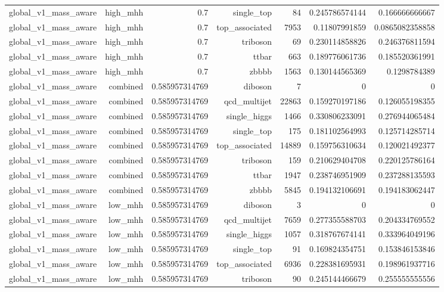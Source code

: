 \begin{table}[htbp]
{\begin{tabular}{lrrrrrr}
global\_v1\_mass\_aware & high\_mhh & 0.7 & single\_top & 84 & 0.245786574144 & 0.166666666667 \\
global\_v1\_mass\_aware & high\_mhh & 0.7 & top\_associated & 7953 & 0.11807991859 & 0.0865082358858 \\
global\_v1\_mass\_aware & high\_mhh & 0.7 & triboson & 69 & 0.230114858826 & 0.246376811594 \\
global\_v1\_mass\_aware & high\_mhh & 0.7 & ttbar & 663 & 0.189776061736 & 0.185520361991 \\
global\_v1\_mass\_aware & high\_mhh & 0.7 & zbbbb & 1563 & 0.130144565369 & 0.1298784389 \\
global\_v1\_mass\_aware & combined & 0.585957314769 & diboson & 7 & 0 & 0 \\
global\_v1\_mass\_aware & combined & 0.585957314769 & qcd\_multijet & 22863 & 0.159270197186 & 0.126055198355 \\
global\_v1\_mass\_aware & combined & 0.585957314769 & single\_higgs & 1466 & 0.330806233091 & 0.276944065484 \\
global\_v1\_mass\_aware & combined & 0.585957314769 & single\_top & 175 & 0.181102564993 & 0.125714285714 \\
global\_v1\_mass\_aware & combined & 0.585957314769 & top\_associated & 14889 & 0.159756310634 & 0.120021492377 \\
global\_v1\_mass\_aware & combined & 0.585957314769 & triboson & 159 & 0.210629404708 & 0.220125786164 \\
global\_v1\_mass\_aware & combined & 0.585957314769 & ttbar & 1947 & 0.238746951909 & 0.237288135593 \\
global\_v1\_mass\_aware & combined & 0.585957314769 & zbbbb & 5845 & 0.194132106691 & 0.194183062447 \\
global\_v1\_mass\_aware & low\_mhh & 0.585957314769 & diboson & 3 & 0 & 0 \\
global\_v1\_mass\_aware & low\_mhh & 0.585957314769 & qcd\_multijet & 7659 & 0.277355588703 & 0.204334769552 \\
global\_v1\_mass\_aware & low\_mhh & 0.585957314769 & single\_higgs & 1057 & 0.318767674141 & 0.333964049196 \\
global\_v1\_mass\_aware & low\_mhh & 0.585957314769 & single\_top & 91 & 0.169824354751 & 0.153846153846 \\
global\_v1\_mass\_aware & low\_mhh & 0.585957314769 & top\_associated & 6936 & 0.228381695931 & 0.198961937716 \\
global\_v1\_mass\_aware & low\_mhh & 0.585957314769 & triboson & 90 & 0.245144466679 & 0.255555555556 \\

\end{tabular}}
\end{table}
